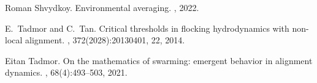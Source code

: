 \documentclass[11pt,letterpaper]{amsart}
\theoremstyle{plain}
\theoremstyle{definition}
\theoremstyle{remark}
\begin{document}
\begin{thebibliography}{10}
Roman Shvydkoy.
\newblock Environmental averaging.
, 2022.

E.~Tadmor and C.~Tan.
\newblock Critical thresholds in flocking hydrodynamics with non-local
  alignment.
,
  372(2028):20130401, 22, 2014.

Eitan Tadmor.
\newblock On the mathematics of swarming: emergent behavior in alignment
  dynamics.
, 68(4):493--503, 2021.

\end{thebibliography}
\end{document}
